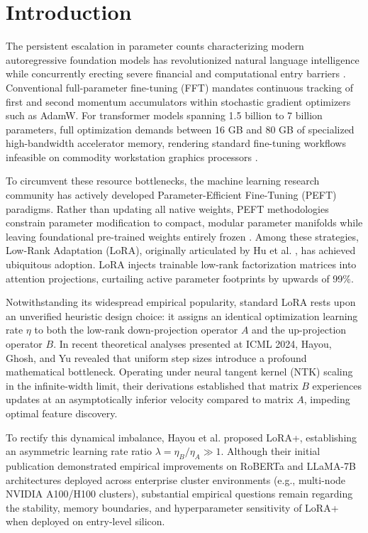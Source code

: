 \documentclass[conference]{IEEEtran}
\begin{document}
\section{Introduction}
The persistent escalation in parameter counts characterizing modern autoregressive foundation models has revolutionized natural language intelligence while concurrently erecting severe financial and computational entry barriers \cite{hu2022lora}. Conventional full-parameter fine-tuning (FFT) mandates continuous tracking of first and second momentum accumulators within stochastic gradient optimizers such as AdamW. For transformer models spanning 1.5 billion to 7 billion parameters, full optimization demands between 16 GB and 80 GB of specialized high-bandwidth accelerator memory, rendering standard fine-tuning workflows infeasible on commodity workstation graphics processors \cite{dettmers2024qlora, qwen2024techreport}.

To circumvent these resource bottlenecks, the machine learning research community has actively developed Parameter-Efficient Fine-Tuning (PEFT) paradigms. Rather than updating all native weights, PEFT methodologies constrain parameter modification to compact, modular parameter manifolds while leaving foundational pre-trained weights entirely frozen \cite{mangrulkar2022peft}. Among these strategies, Low-Rank Adaptation (LoRA), originally articulated by Hu et al. \cite{hu2022lora}, has achieved ubiquitous adoption. LoRA injects trainable low-rank factorization matrices into attention projections, curtailing active parameter footprints by upwards of 99\%.

Notwithstanding its widespread empirical popularity, standard LoRA rests upon an unverified heuristic design choice: it assigns an identical optimization learning rate $\eta$ to both the low-rank down-projection operator $A$ and the up-projection operator $B$. In recent theoretical analyses presented at ICML 2024, Hayou, Ghosh, and Yu \cite{hayou2024loraplus} revealed that uniform step sizes introduce a profound mathematical bottleneck. Operating under neural tangent kernel (NTK) scaling in the infinite-width limit, their derivations established that matrix $B$ experiences updates at an asymptotically inferior velocity compared to matrix $A$, impeding optimal feature discovery.

To rectify this dynamical imbalance, Hayou et al. proposed LoRA+, establishing an asymmetric learning rate ratio $\lambda = \eta_B / \eta_A \gg 1$. Although their initial publication demonstrated empirical improvements on RoBERTa and LLaMA-7B architectures deployed across enterprise cluster environments (e.g., multi-node NVIDIA A100/H100 clusters), substantial empirical questions remain regarding the stability, memory boundaries, and hyperparameter sensitivity of LoRA+ when deployed on entry-level silicon.
\end{document}
